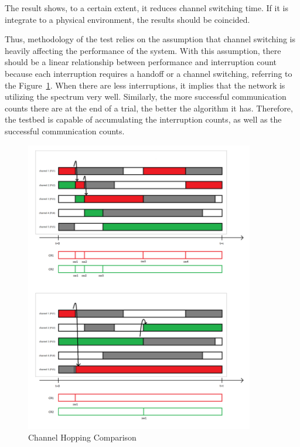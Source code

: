 The result shows, to a certain extent, it reduces channel switching time. If it is integrate to a physical environment, the results should be coincided.

Thus, methodology of the test relies on the assumption that channel switching is heavily affecting the performance of the system. With this assumption, there should be a linear relationship between performance and interruption count because each interruption requires a handoff or a channel switching, referring to the Figure~\ref{fig:channel_hopping}. When there are less interruptions, it implies that the network is utilizing the spectrum very well. Similarly, the more successful communication counts there are at the end of a trial, the better the algorithm it has. Therefore, the testbed is capable of accumulating the interruption counts, as well as the successful communication counts.

\begin{figure}[ht]
\centering
\includegraphics[width=10cm]{figures/channel_hopping.png}
\caption{Channel Hopping Comparison}
\label{fig:channel_hopping}
\end{figure}

